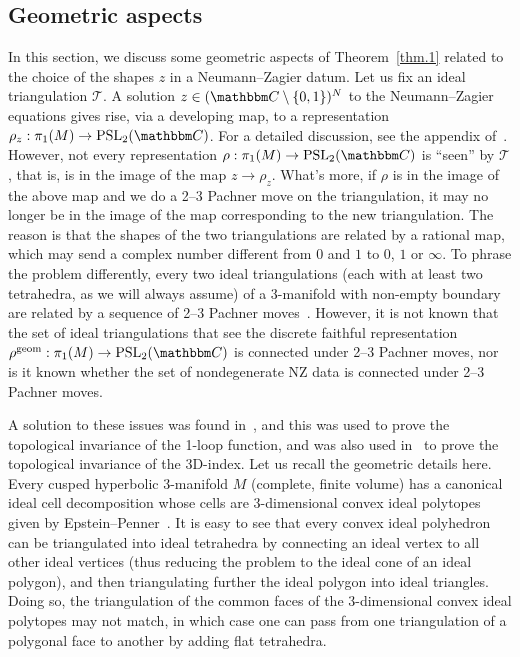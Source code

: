 \documentclass[12pt,reqno]{amsart}
\theoremstyle{definition}
\def\BC{\mathbbm C}
\def\calT{\mathcal T}
\def\PSL{\mathrm{PSL}}
\def\geom{\mathrm{geom}}
\renewcommand{\=}{\;=\;}
\begin{document}
\subsection{Geometric aspects}
\label{sub.geometric}

In this section, we discuss some geometric aspects of Theorem~\ref{thm.1} related
to the choice of the shapes $z$ in a Neumann--Zagier datum. Let us fix an ideal
triangulation $\calT$. A solution $z \in (\BC\setminus\{0,1\})^N$ to the
Neumann--Zagier equations gives rise, via a developing map, to a representation
$\rho_z: \pi_1(M) \to \PSL_2(\BC)$. For a detailed discussion, see the appendix
of~\cite{BoydII}. However, not every representation $\rho: \pi_1(M) \to \PSL_2(\BC)$ is
``seen'' by $\calT$, that is, is in the image of the map $z \to \rho_z$.
What's more, if $\rho$ is in the image of the above map and we do a 2--3 Pachner
move on the triangulation, it may no longer be in the image of the map corresponding
to the new triangulation. The reason is that the shapes of the two triangulations
are related by a rational map, which may send a complex number different from $0$
and $1$ to $0$, $1$ or $\infty$. To phrase the problem differently, every two ideal
triangulations (each with at least two tetrahedra, as we will always assume) of
a 3-manifold with non-empty boundary are related by a sequence of 2--3 Pachner
moves~\cite{Matveev,Piergallini}. However, it is not known that the set of
ideal triangulations that see the discrete faithful representation
$\rho^\geom : \pi_1(M) \to \PSL_2(\BC)$ is connected under 2--3 Pachner moves,
nor is it known whether the set of nondegenerate NZ data is connected under
2--3 Pachner moves. 

A solution to these issues was found in~\cite{DG}, and this was used to
prove the topological invariance of the 1-loop function, and was also used
in~\cite{GHRS} to prove the topological invariance of the 3D-index. Let us recall
the geometric details here. Every cusped hyperbolic 3-manifold $M$ (complete,
finite volume) has a canonical ideal cell decomposition whose cells are
3-dimensional convex ideal polytopes given by Epstein--Penner~\cite{EP}. It is easy to
see that every convex ideal polyhedron can be triangulated into ideal
tetrahedra by connecting an ideal vertex to all other ideal vertices (thus
reducing the problem to the ideal cone of an ideal polygon), and then triangulating
further the ideal polygon into ideal triangles. Doing so, the triangulation of
the common faces of the 3-dimensional convex ideal polytopes may not match, in
which case one can pass from one triangulation of a polygonal face to another by
adding flat tetrahedra. 
\end{document}
